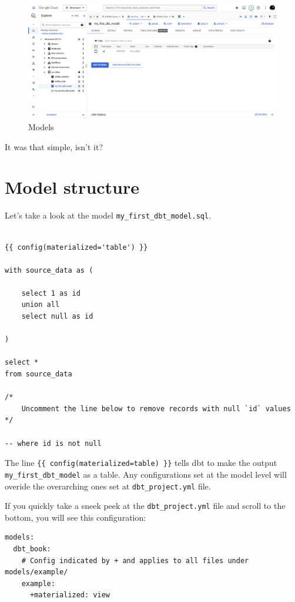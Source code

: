 \documentclass[
]{book}
\begin{document}
\begin{figure}
\centering
\includegraphics{./images/model_outputs.png}
\caption{Models}
\end{figure}

It was that simple, isn't it?

\hypertarget{model-structure}{%
\section{Model structure}\label{model-structure}}

Let's take a look at the model \texttt{my\_first\_dbt\_model.sql}.

\begin{verbatim}

{{ config(materialized='table') }}

with source_data as (

    select 1 as id
    union all
    select null as id

)

select *
from source_data

/*
    Uncomment the line below to remove records with null `id` values
*/

-- where id is not null
\end{verbatim}

The line \texttt{\{\{\ config(materialized=\textquotesingle{}table\textquotesingle{})\ \}\}} tells dbt to make the output \texttt{my\_first\_dbt\_model} as a table. Any configurations set at the model level will overide the overarching ones set at \texttt{dbt\_project.yml} file.

If you quickly take a sneek peek at the \texttt{dbt\_project.yml} file and scroll to the bottom, you will see this configuration:

\begin{verbatim}
models:
  dbt_book:
    # Config indicated by + and applies to all files under models/example/
    example:
      +materialized: view
\end{verbatim}
\end{document}
